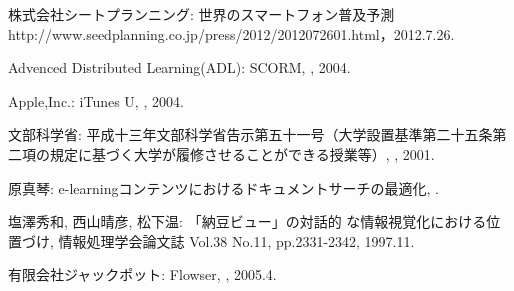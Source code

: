 \begin{bib}[100]


  株式会社シートプランニング:
  \newblock 世界のスマートフォン普及予測
  \newblock http://www.seedplanning.co.jp/press/2012/2012072601.html，2012.7.26.

  Advenced Distributed Learning(ADL):
  \newblock SCORM,
  , 2004.
  
  Apple,Inc.:
  \newblock iTunes U,
  , 2004. 
 
  文部科学省:
  \newblock 平成十三年文部科学省告示第五十一号（大学設置基準第二十五条第二項の規定に基づく大学が履修させることができる授業等）,
  , 2001.
  
  原真琴:
  \newblock e-learningコンテンツにおけるドキュメントサーチの最適化,
  .
  
  塩澤秀和, 西山晴彦, 松下温:
  \newblock 「納豆ビュー」の対話的 な情報視覚化における位置づけ,
  \newblock 情報処理学会論文誌 Vol.38 No.11, pp.2331-2342, 1997.11.
  
  有限会社ジャックポット:
  \newblock Flowser,
  , 2005.4.
  
\end{bib}